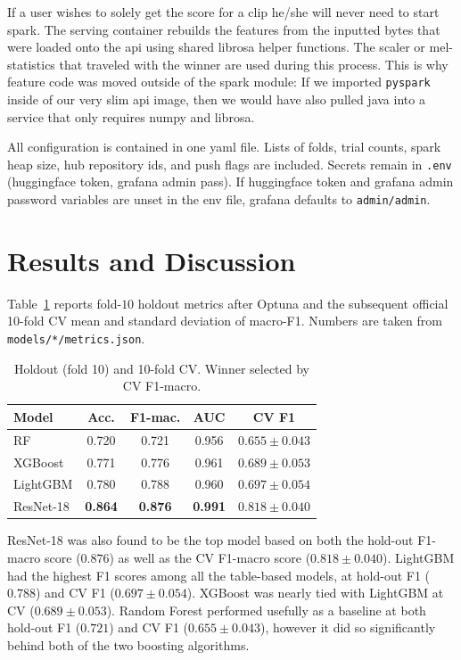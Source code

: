 \documentclass[conference]{IEEEtran}
\begin{document}
If a user wishes to solely get the score for a clip he/she will never need to start spark.
The serving container rebuilds the features from the inputted bytes that were loaded onto the api using shared librosa helper functions. The scaler or mel-statistics that traveled with the winner are used during this process. This is why feature code was moved outside of the spark module: If we imported \texttt{pyspark} inside of our very slim api image, then we would have also pulled java into a service that only requires numpy and librosa.

All configuration is contained in one yaml file.
Lists of folds, trial counts, spark heap size, hub repository ids, and push flags are included.
Secrets remain in \texttt{.env} (huggingface token, grafana admin pass).
If huggingface token and grafana admin password variables are unset in the env file, grafana defaults to \texttt{admin/admin}.

\section{Results and Discussion}
\label{sec:results}

Table~\ref{tab:results} reports fold-\(10\) holdout metrics after Optuna and the subsequent official 10-fold CV mean and standard deviation of macro-F1.
Numbers are taken from \texttt{models/*/metrics.json}.

\begin{table}[!t]
  \renewcommand{\arraystretch}{1.15}
  \setlength{\tabcolsep}{3pt}
  \caption{Holdout (fold 10) and 10-fold CV. Winner selected by CV F1-macro.}
  \label{tab:results}
  \centering
  \begin{tabular}{lcccc}
    \toprule
    Model & Acc. & F1-mac. & AUC & CV F1 \\
    \midrule
    RF & 0.720 & 0.721 & 0.956 & \(0.655\pm 0.043\) \\
    XGBoost & 0.771 & 0.776 & 0.961 & \(0.689\pm 0.053\) \\
    LightGBM & 0.780 & 0.788 & 0.960 & \(0.697\pm 0.054\) \\
    ResNet-18 & \textbf{0.864} & \textbf{0.876} & \textbf{0.991} & \(\mathbf{0.818\pm 0.040}\) \\
    \bottomrule
  \end{tabular}
\end{table}

ResNet-18 was also found to be the top model based on both the hold-out F1-macro score (\(0.876\)) as well as the CV F1-macro score (\(0.818 \pm 0.040\)).
LightGBM had the highest F1 scores among all the table-based models, at hold-out F1 (\(0.788\)) and CV F1 (\(0.697 \pm 0.054\)). XGBoost was nearly tied with LightGBM at CV (\(0.689 \pm 0.053\)).
Random Forest performed usefully as a baseline at both hold-out F1 (\(0.721\)) and CV F1 (\(0.655 \pm 0.043\)), however it did so significantly behind both of the two boosting algorithms.
\end{document}
